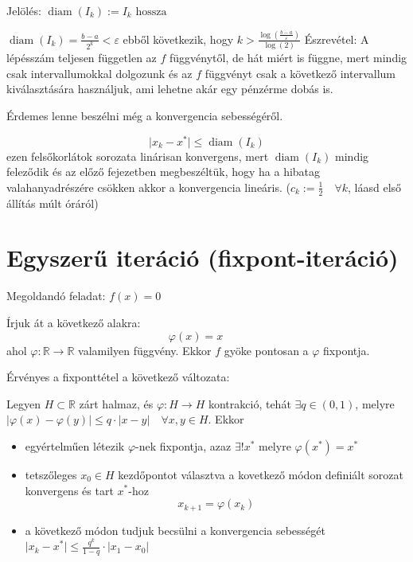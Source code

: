 Jelölés: $\operatorname{diam} (I_{k}) := I_{k} \text{ hossza}$

$\operatorname{diam}(I_{k}) = \frac{b- a}{2^{k}} < \varepsilon$ ebből következik, hogy $k > \frac{\log\left( \frac{b-a}{\varepsilon} \right)}{\log(2)}$
Észrevétel: A lépésszám teljesen független az $f$ függvénytől, de hát miért is függne, mert mindig csak intervallumokkal dolgozunk és az $f$ függvényt csak a következő intervallum kiválasztására használjuk, ami lehetne akár egy pénzérme dobás is.

Érdemes lenne beszélni még a konvergencia sebességéről.

\begin{equation*}
    \lvert x_{k} - x^{*} \rvert  \leq \operatorname{diam}(I_{k})
\end{equation*}
ezen felsőkorlátok sorozata linárisan konvergens, mert $\operatorname{diam}(I_{k})$ mindig feleződik és az előző fejezetben megbeszéltük, hogy ha a hibatag valahanyadrészére csökken akkor a konvergencia lineáris.
($c_{k}:= \frac{1}{2} \quad \forall k$, láasd első állítás múlt óráról)


\section{Egyszerű iteráció (fixpont-iteráció)}
Megoldandó feladat: $f(x) = 0$

Írjuk át a következő alakra:
\begin{equation*}
    \varphi(x) = x \qquad
\end{equation*}
ahol $\varphi:\mathbb{R} \to \mathbb{R}$ valamilyen függvény.
Ekkor $f$ gyöke pontosan a $\varphi$ fixpontja.

Érvényes a fixponttétel a következő változata:
\begin{tetel}
    Legyen $H \subset \mathbb{R}$ zárt halmaz, és $\varphi: H \to H$ kontrakció, tehát $\exists q \in (0, 1)$, melyre $\lvert \varphi(x) - \varphi(y) \rvert \leq q \cdot \lvert x - y \rvert \quad \forall x , y \in H$. Ekkor
    \begin{itemize}
        \item egyértelműen létezik $\varphi$-nek fixpontja, azaz $\exists ! x^{*}$ melyre $\varphi(x^{*}) = x^{*}$
        \item tetszőleges $x_{0} \in H$ kezdőpontot választva a kovetkező módon definiált sorozat konvergens és tart $x^{*}$-hoz
        \begin{equation*}
            x_{k+1} = \varphi(x_{k})
        \end{equation*}
        \item a következő módon tudjuk becsülni a konvergencia sebességét $\lvert x_{k} - x^{*} \rvert \leq \frac{q^{k}}{1 - q} \cdot \lvert x_{1} - x_{0} \rvert$
    \end{itemize}
\end{tetel}

